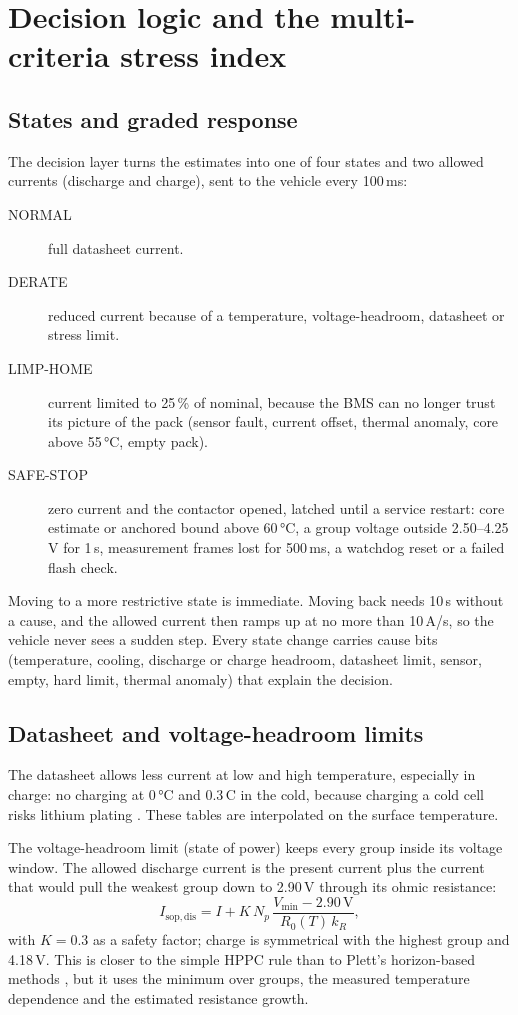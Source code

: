 \chapter{Decision logic and the multi-criteria stress index}\label{ch:decision}

\section{States and graded response}
The decision layer turns the estimates into one of four states and two allowed currents (discharge and charge), sent to the vehicle every 100\,ms:
\begin{description}
  \item[NORMAL] full datasheet current.
  \item[DERATE] reduced current because of a temperature, voltage-headroom, datasheet or stress limit.
  \item[LIMP-HOME] current limited to 25\,\% of nominal, because the BMS can no longer trust its picture of the pack (sensor fault, current offset, thermal anomaly, core above 55\,°C, empty pack).
  \item[SAFE-STOP] zero current and the contactor opened, latched until a service restart: core estimate or anchored bound above 60\,°C, a group voltage outside 2.50--4.25\,V for 1\,s, measurement frames lost for 500\,ms, a watchdog reset or a failed flash check.
\end{description}
Moving to a more restrictive state is immediate. Moving back needs 10\,s without a cause, and the allowed current then ramps up at no more than 10\,A/s, so the vehicle never sees a sudden step. Every state change carries cause bits (temperature, cooling, discharge or charge headroom, datasheet limit, sensor, empty, hard limit, thermal anomaly) that explain the decision.

\section{Datasheet and voltage-headroom limits}
The datasheet allows less current at low and high temperature, especially in charge: no charging at 0\,°C and 0.3\,C in the cold, because charging a cold cell risks lithium plating \citep{waldmann2018}. These tables are interpolated on the surface temperature.

The voltage-headroom limit (state of power) keeps every group inside its voltage window. The allowed discharge current is the present current plus the current that would pull the weakest group down to 2.90\,V through its ohmic resistance:
\begin{equation}
  I_\mathrm{sop,dis} = I + K\,N_p\,\frac{V_\mathrm{min} - 2.90\,\mathrm{V}}{R_0(T)\,k_R},
\end{equation}
with $K = 0.3$ as a safety factor; charge is symmetrical with the highest group and 4.18\,V. This is closer to the simple HPPC rule than to Plett's horizon-based methods \citep{plett2004pow}, but it uses the minimum over groups, the measured temperature dependence and the estimated resistance growth.

